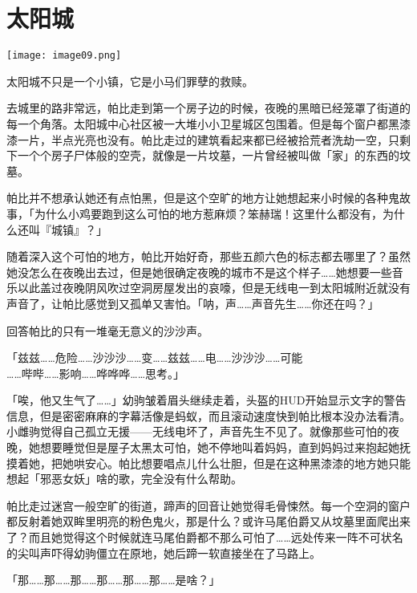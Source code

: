 \chapter{太阳城}

\texttt{[image: image09.png]}

\begin{intro}
太阳城不只是一个小镇，它是小马们罪孽的救赎。
\end{intro}


去城里的路非常远，帕比走到第一个房子边的时候，夜晚的黑暗已经笼罩了街道的每一个角落。太阳城中心社区被一大堆小小卫星城区包围着。但是每个窗户都黑漆漆一片，半点光亮也没有。帕比走过的建筑看起来都已经被拾荒者洗劫一空，只剩下一个个房子尸体般的空壳，就像是一片坟墓，一片曾经被叫做「家」的东西的坟墓。

帕比并不想承认她还有点怕黑，但是这个空旷的地方让她想起来小时候的各种鬼故事，「为什么小鸡要跑到这么可怕的地方惹麻烦？笨赫瑞！这里什么都没有，为什么还叫『城镇』？」

随着深入这个可怕的地方，帕比开始好奇，那些五颜六色的标志都去哪里了？虽然她没怎么在夜晚出去过，但是她很确定夜晚的城市不是这个样子……她想要一些音乐以此盖过夜晚阴风吹过空洞房屋发出的哀嚎，但是无线电一到太阳城附近就没有声音了，让帕比感觉到又孤单又害怕。「呐，声……声音先生……你还在吗？」

回答帕比的只有一堆毫无意义的沙沙声。

「{\mt 兹兹……危险……沙沙沙……变……兹兹……电……沙沙沙……可能\\……哔哔……影响……哗哗哗……思考。}」


「唉，他又生气了……」幼驹皱着眉头继续走着，头盔的HUD开始显示文字的警告信息，但是密密麻麻的字幕活像是蚂蚁，而且滚动速度快到帕比根本没办法看清。小雌驹觉得自己孤立无援——无线电坏了，声音先生不见了。就像那些可怕的夜晚，她想要睡觉但是屋子太黑太可怕，她不停地叫着妈妈，直到妈妈过来抱起她抚摸着她，把她哄安心。帕比想要唱点儿什么壮胆，但是在这种黑漆漆的地方她只能想起「邪恶女妖」啥的歌，完全没有什么帮助。

帕比走过迷宫一般空旷的街道，蹄声的回音让她觉得毛骨悚然。每一个空洞的窗户都反射着她双眸里明亮的粉色鬼火，那是什么？或许马尾伯爵又从坟墓里面爬出来了？而且她觉得这个时候就连马尾伯爵都不那么可怕了……远处传来一阵不可状名的尖叫声吓得幼驹僵立在原地，她后蹄一软直接坐在了马路上。

「那……那……那……那……那……那……是啥？」

